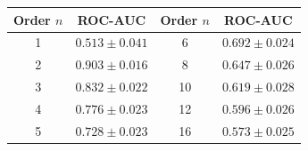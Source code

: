 \begin{tabular}{cc@{\hskip 2.4em}cc}
  \toprule
  Order $n$ & ROC-AUC & Order $n$ & ROC-AUC \\
  \midrule
  1 & $0.513 \pm 0.041$ & 6 & $0.692 \pm 0.024$ \\
  2 & $\mathbf{0.903 \pm 0.016}$ & 8 & $0.647 \pm 0.026$ \\
  3 & $0.832 \pm 0.022$ & 10 & $0.619 \pm 0.028$ \\
  4 & $0.776 \pm 0.023$ & 12 & $0.596 \pm 0.026$ \\
  5 & $0.728 \pm 0.023$ & 16 & $0.573 \pm 0.025$ \\
  \bottomrule
\end{tabular}
